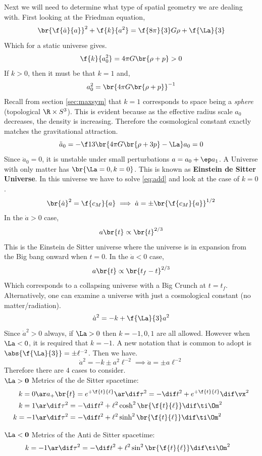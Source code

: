 \documentclass{article}
\begin{document}
Next we will need to determine what type of spatial geometry we are dealing with. First looking at the Friedman equation,
\[ \br{\f{\dot{a}}{a}}^2 + \f{k}{a^2} = \f{8 \pi}{3} G \rho + \f{\La}{3} \]
Which for a static universe gives.
\[ \f{k}{a_0^2} = 4\pi G\br{\rho + p} > 0 \]
If $k > 0$, then it must be that $k = 1$ and,
\[ a_0^2 = \br{4\pi G\br{\rho + p}}^{-1} \]
Recall from section \ref{sec:maxsym} that $k=1$ corresponds to space being a \textit{sphere} (topological $\R \times S^3$). This is evident because as the effective radius scale $a_0$ decreases, the density is increasing. Therefore the cosmological constant exactly matches the gravitational attraction.
\[ \ddot{a}_0 = -\f13 \br{4\pi G \br{\rho + 3 p} - \La} a_0 = 0 \]
Since $\ddot{a}_0 = 0$, it is unstable under small perturbations $a = a_0 + \ep a_1$. A Universe with only matter has $\br{\La = 0, k = 0}$. This is known as \textbf{Einstein de Sitter Universe}. In this universe we have to solve \eqref{eq:add} and look at the case of $k = 0$.
\[ \br{\dot{a}}^2 = \f{c_M}{a} \implies \dot{a} = \pm\br{\f{c_M}{a}}^{1/2} \]
In the $\dot{a} > 0$ case,
\[ a\br{t} \propto \br{t}^{2/3} \]
This is the Einstein de Sitter universe where the universe is in expansion from the Big bang onward when $t = 0$. In the $\dot{a} < 0$ case,
\[ a\br{t} \propto \br{t_f - t}^{2/3} \]
Which corresponds to a collapsing universe with a Big Crunch at $t = t_f$. Alternatively, one can examine a universe with just a cosmological constant (no matter/radiation).
\[ \dot{a}^2 = -k + \f{\La}{3} a^2 \]
Since $\dot{a}^2 > 0$ always, if $\La > 0$ then $k=-1,0,1$ are all allowed. However when $\La < 0$, it is required that $k = -1$. A new notation that is common to adopt is $\abs{\f{\La}{3}} = \pm \ell^{-2}$. Then we have.
\[ \dot{a}^2 = -k \pm a^2 \ell^{-2} \implies \ddot{a} = \pm a \ell^{-2} \]
Therefore there are $4$ cases to consider.\\

$\mathbf{\La > 0}$ Metrics of the de Sitter spacetime:
\begin{align*}
k = 0 &\ar a_+\br{t} = e^{+\f{t}{\ell}} \ar \dif \tau^2 = - \dif t^2 + e^{+\f{t}{\ell}} \dif \vx^2 \\
k = 1 &\ar \dif \tau^2 = - \dif t^2 + \ell^2 \cosh^2\br{\f{t}{\ell}} \dif \ti\Om^2 \\
k = -1 &\ar \dif \tau^2 = - \dif t^2 + \ell^2 \sinh^2\br{\f{t}{\ell}} \dif \ti\Om^2
\end{align*}

$\mathbf{\La < 0}$ Metrics of the Anti de Sitter spacetime:
\begin{align*}
k = -1 &\ar \dif \tau^2 = - \dif t^2 + \ell^2 \sin^2\br{\f{t}{\ell}} \dif \ti\Om^2
\end{align*}
\end{document}
